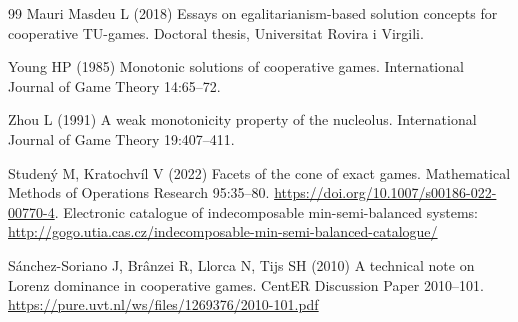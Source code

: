 \documentclass[11pt]{article}
\begin{document}
\begin{thebibliography}{99}
Mauri Masdeu L (2018) Essays on egalitarianism-based solution concepts for
cooperative TU-games. Doctoral thesis, Universitat Rovira i Virgili.

Young HP (1985) Monotonic solutions of cooperative games.
International Journal of Game Theory 14:65--72.

Zhou L (1991) A weak monotonicity property of the nucleolus.
International Journal of Game Theory 19:407--411.

Studen\'y M, Kratochv\'il V (2022) Facets of the cone of exact games.
Mathematical Methods of Operations Research 95:35--80.
\url{https://doi.org/10.1007/s00186-022-00770-4}.
Electronic catalogue of indecomposable min-semi-balanced systems:
\url{http://gogo.utia.cas.cz/indecomposable-min-semi-balanced-catalogue/}

S\'anchez-Soriano J, Br\^anzei R, Llorca N, Tijs SH (2010) A technical note
on Lorenz dominance in cooperative games. CentER Discussion Paper 2010--101.
\url{https://pure.uvt.nl/ws/files/1269376/2010-101.pdf}

\end{thebibliography}
\end{document}
